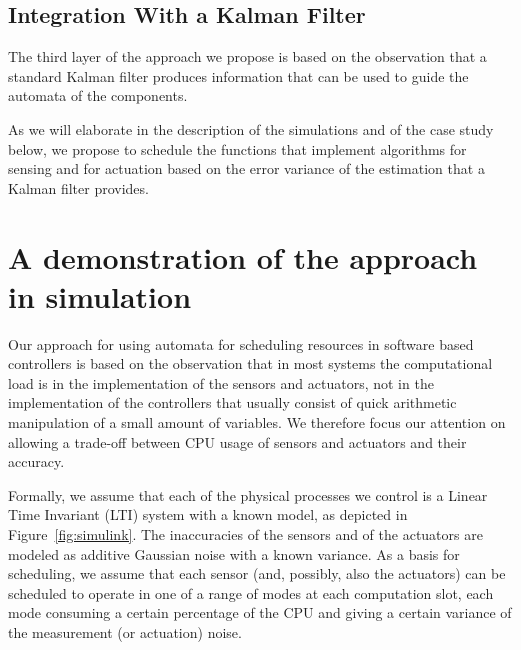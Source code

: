 \documentclass{sig-alternate-ipsn13}
\begin{document}
\subsection{Integration With a Kalman Filter}
The third layer of the approach we propose is based on the observation that a standard Kalman filter produces information that can be used to guide the automata of the components. 

As we will elaborate in the description of the simulations and of the case study below, we propose to schedule the functions that implement algorithms for sensing and for actuation based on the error variance of the estimation that a Kalman filter provides. 



\section{A demonstration of the approach in simulation}
\label{sec:simulation}

Our approach for using automata for scheduling resources in software based controllers is based on the observation that in most systems the computational load is in the implementation of the sensors and actuators, not in the implementation of the controllers that usually consist of quick arithmetic manipulation of a small amount of variables. We therefore focus our attention on allowing a trade-off between CPU usage of sensors and actuators and their accuracy. %


Formally, we assume that each of the physical processes we control is a Linear Time Invariant (LTI) system with a known model, as depicted in Figure~\ref{fig:simulink}. The inaccuracies of the sensors and of the actuators are modeled as additive Gaussian noise with a known variance. As a basis for scheduling, we assume that each sensor (and, possibly, also the actuators) can be scheduled to operate in one of a range of modes at each computation slot, each mode consuming a certain percentage of the CPU and giving a certain variance of the measurement (or actuation) noise.
\end{document}
